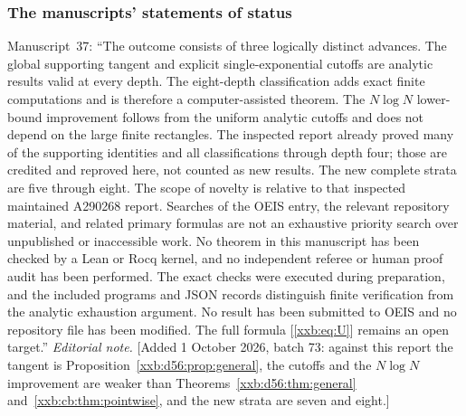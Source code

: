 \documentclass[11pt,a4paper]{article}
\numberwithin{equation}{section}
\theoremstyle{definition}
\theoremstyle{remark}
\theoremstyle{plain}
\begin{document}
\subsubsection{The manuscripts' statements of status}

Manuscript~37: ``The outcome consists of three logically distinct advances.
The global supporting tangent and explicit single-exponential cutoffs are
analytic results valid at every depth. The eight-depth classification adds
exact finite computations and is therefore a computer-assisted theorem. The
$N\log N$ lower-bound improvement follows from the uniform analytic cutoffs and
does not depend on the large finite rectangles.  The inspected report already
proved many of the supporting identities and all classifications through depth
four; those are credited and reproved here, not counted as new results. The
new complete strata are five through eight. The scope of novelty is relative to
that inspected maintained A290268 report. Searches of the OEIS entry, the
relevant repository material, and related primary formulas are not an
exhaustive priority search over unpublished or inaccessible work.  No theorem
in this manuscript has been checked by a Lean or Rocq kernel, and no
independent referee or human proof audit has been performed. The exact checks
were executed during preparation, and the included programs and JSON records
distinguish finite verification from the analytic exhaustion argument. No
result has been submitted to OEIS and no repository file has been modified. The
full formula [\eqref{xxb:eq:U}] remains an open target.''
\emph{Editorial note.}  [Added 1 October 2026, batch 73: against this report
the tangent is Proposition~\ref{xxb:d56:prop:general}, the cutoffs and the
$N\log N$ improvement are weaker than Theorems~\ref{xxb:d56:thm:general}
and~\ref{xxb:cb:thm:pointwise}, and the new strata are seven and eight.]
\end{document}
